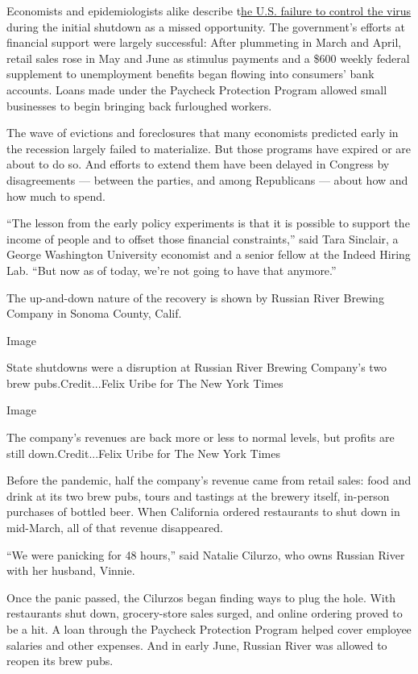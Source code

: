 Economists and epidemiologists alike describe
t\href{https://www.nytimes3xbfgragh.onion/2020/07/18/us/politics/trump-coronavirus-response-failure-leadership.html}{he
U.S. failure to control the virus} during the initial shutdown as a
missed opportunity. The government's efforts at financial support were
largely successful: After plummeting in March and April, retail sales
rose in May and June as stimulus payments and a \$600 weekly federal
supplement to unemployment benefits began flowing into consumers' bank
accounts. Loans made under the Paycheck Protection Program allowed small
businesses to begin bringing back furloughed workers.

The wave of evictions and foreclosures that many economists predicted
early in the recession largely failed to materialize. But those programs
have expired or are about to do so. And efforts to extend them have been
delayed in Congress by disagreements --- between the parties, and among
Republicans --- about how and how much to spend.

``The lesson from the early policy experiments is that it is possible to
support the income of people and to offset those financial
constraints,'' said Tara Sinclair, a George Washington University
economist and a senior fellow at the Indeed Hiring Lab. ``But now as of
today, we're not going to have that anymore.''

The up-and-down nature of the recovery is shown by Russian River Brewing
Company in Sonoma County, Calif.

Image

State shutdowns were a disruption at Russian River Brewing Company's two
brew pubs.Credit...Felix Uribe for The New York Times

Image

The company's revenues are back more or less to normal levels, but
profits are still down.Credit...Felix Uribe for The New York Times

Before the pandemic, half the company's revenue came from retail sales:
food and drink at its two brew pubs, tours and tastings at the brewery
itself, in-person purchases of bottled beer. When California ordered
restaurants to shut down in mid-March, all of that revenue disappeared.

``We were panicking for 48 hours,'' said Natalie Cilurzo, who owns
Russian River with her husband, Vinnie.

Once the panic passed, the Cilurzos began finding ways to plug the hole.
With restaurants shut down, grocery-store sales surged, and online
ordering proved to be a hit. A loan through the Paycheck Protection
Program helped cover employee salaries and other expenses. And in early
June, Russian River was allowed to reopen its brew pubs.

